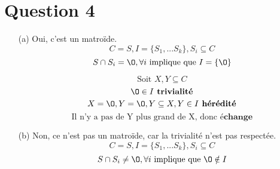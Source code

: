 \documentclass[10pt,letterpaper]{article}
\begin{document}
	\section*{Question 4}
	\begin{enumerate}
		\item[(a)]
		Oui, c'est un matroïde.
		$$C = S, I = \{S_1,...S_k\}, S_i \subseteq C$$
		$$S \cap S_i = \O, \forall i \text{ implique que } I = \{\O\}$$
		
	 	$$\text{Soit } X, Y \subseteq C$$
		$$ \O \in I \textbf{ trivialité}$$
		$$ X = \O, Y = \O, Y \subseteq X, Y \in I \textbf{ hérédité}$$
		$$\text{Il n'y a pas de Y plus grand de X, donc} \textbf{ échange}$$
		\item[(b)]
		Non, ce n'est pas un matroïde, car la trivialité n'est pas respectée.\\
		$$C = S, I = \{S_1,...S_k\}, S_i \subseteq C$$
		$$S \cap S_i \ne \O, \forall i \text{ implique que } \O \notin I$$
	\end{enumerate}
\end{document}
